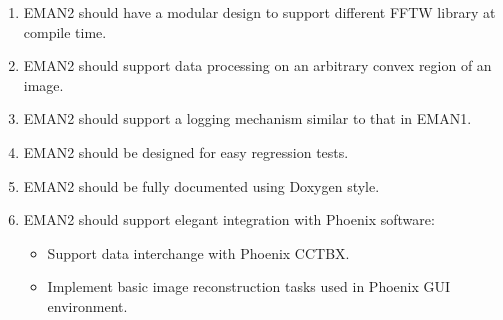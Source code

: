 \begin{enumerate}
    \item
      EMAN2 should have a modular design to support different FFTW
      library at compile time.

    \item
      EMAN2 should support data processing on an arbitrary convex
      region of an image.
 
    \item
      EMAN2 should support a logging mechanism similar to that in EMAN1.

    \item
      EMAN2 should be designed for easy regression tests.

    \item
      EMAN2 should be fully documented using Doxygen style.

    \item
      EMAN2 should support elegant integration with Phoenix software:

      \begin{itemize}
	\item
	  Support data interchange with Phoenix CCTBX.
	\item
	  Implement basic image reconstruction tasks used in Phoenix
	  GUI environment. 
      \end{itemize}
 
\end{enumerate}

%